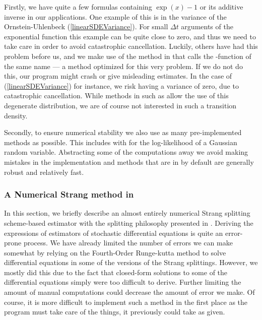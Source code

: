 Firstly, we have quite a few formulas containing $\exp\left(x\right) - 1$ or its additive inverse in our applications. One example of this is in the variance of the Ornstein-Uhlenbeck (\ref{linearSDEVariance}). For small $\Delta t$ arguments of the exponential function this example can be quite close to zero, and thus we need to take care in order to avoid catastrophic cancellation. Luckily, others have had this problem before us, and we make use of the  method in  that calls the -function of the same name — a method optimized for this very problem. \cite{cppreference_expm1} If we do not do this, our program might crash or give misleading estimates. In the case of (\ref{linearSDEVariance}) for instance, we risk having a variance of zero, due to catastrophic cancellation. While methods in  such as  allow the use of this degenerate distribution, we are of course not interested in such a transition density.

Secondly, to ensure numerical stability we also use as many pre-implemented methods as possible. This includes  with  for the log-likelihood of a Gaussian random variable. Abstracting some of the computations away we avoid making mistakes in the implementation and methods that are in  by default are generally robust and relatively fast.
\subsubsection{A Numerical Strang method in }\label{subsection:NumericalStrangSplitting}
In this section, we briefly describe an almost entirely numerical Strang splitting scheme-based estimator with the splitting philosophy presented in \cite{SplittingSchemes}. Deriving the expressions of estimators of stochastic differential equations is quite an error-prone process. We have already limited the number of errors we can make somewhat by relying on the Fourth-Order Runge-kutta method to solve differential equations in some of the versions of the Strang splittings. However, we mostly did this due to the fact that closed-form solutions to some of the differential equations simply were too difficult to derive. Further limiting the amount of manual computations could decrease the amount of error we make. Of course, it is more difficult to implement such a method in the first place as the program must take care of the things, it previously could take as given.

